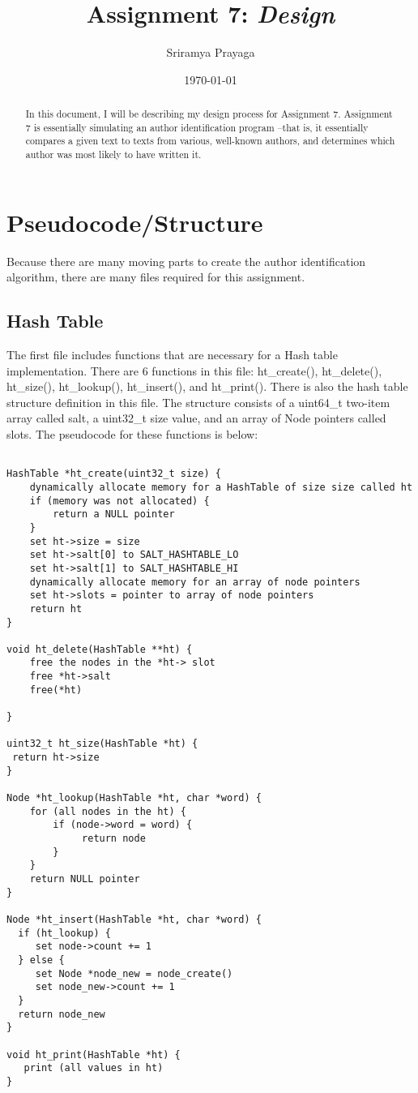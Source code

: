 \documentclass[11pt]{article}
\title{Assignment 7: \emph{Design}}
\author{Sriramya Prayaga}
\date{\today}
\begin{document}
 \maketitle

\begin{abstract}
\begin{center}
In this document, I will be describing my design process for Assignment 7. Assignment 7 is essentially simulating an author identification program --that is, it essentially compares a given text to texts from various, well-known authors, and determines which author was most likely to have written it.
\end{center}
\end{abstract}
\section{Pseudocode/Structure}
Because there are many moving parts to create the author identification algorithm, there are many files required for this assignment.
\subsection{Hash Table}
The first file includes functions that are necessary for a Hash table implementation. There are 6 functions in this file: ht\_create(), ht\_delete(), ht\_size(), ht\_lookup(), ht\_insert(), and ht\_print(). There is also the hash table structure definition in this file. The structure consists of a uint64\_t two-item array called salt, a uint32\_t size value, and an array of Node pointers called slots. The pseudocode for these functions is below:
\begin{verbatim}
    
HashTable *ht_create(uint32_t size) {
    dynamically allocate memory for a HashTable of size size called ht
    if (memory was not allocated) {
        return a NULL pointer
    }
    set ht->size = size
    set ht->salt[0] to SALT_HASHTABLE_LO
    set ht->salt[1] to SALT_HASHTABLE_HI
    dynamically allocate memory for an array of node pointers
    set ht->slots = pointer to array of node pointers
    return ht
}

void ht_delete(HashTable **ht) {
    free the nodes in the *ht-> slot
    free *ht->salt
    free(*ht)

}

uint32_t ht_size(HashTable *ht) {
 return ht->size
}

Node *ht_lookup(HashTable *ht, char *word) {
    for (all nodes in the ht) {
        if (node->word = word) {
             return node
        }
    }
    return NULL pointer
}

Node *ht_insert(HashTable *ht, char *word) {
  if (ht_lookup) {
     set node->count += 1
  } else {
     set Node *node_new = node_create()
     set node_new->count += 1
  }
  return node_new
}

void ht_print(HashTable *ht) {
   print (all values in ht)
}
    
\end{verbatim}
\end{document}
